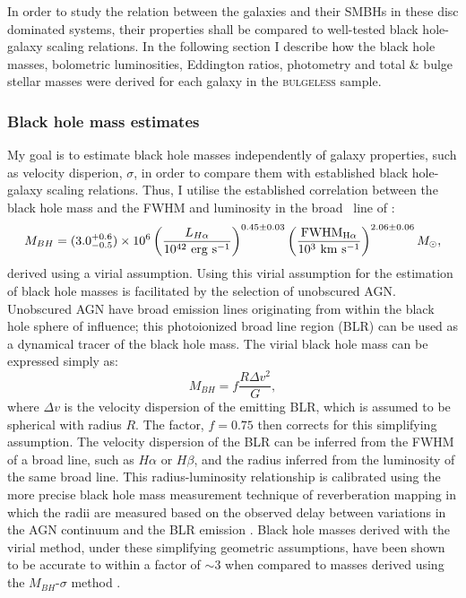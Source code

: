 In order to study the relation between the galaxies and their SMBHs in these disc dominated systems, their properties shall be compared to well-tested black hole-galaxy scaling relations. In the following section I describe how the black hole masses, bolometric luminosities, Eddington ratios, photometry and total \& bulge stellar masses were derived for each galaxy in the \textsc{bulgeless} sample. 

\subsubsection{Black hole mass estimates}\label{sec:bhmass}

My goal is to estimate black hole masses independently of galaxy properties, such as velocity disperion, $\sigma$, in order to compare them with established black hole-galaxy scaling relations. Thus, I utilise the established correlation between the black hole mass and the FWHM and luminosity in the broad \ha\ line of \citet{gh07a}: 
\begin{equation}\label{greeneho}
M_{BH} = (3.0^{+0.6}_{-0.5}) \times 10^6 \left ( \frac{L_{H\alpha}}{10^{42} ~\rm{erg}~\rm{s}^{-1}} \right )^{0.45\pm0.03} \left ( \frac{\rm{FWHM}_{H\alpha}}{10^{3}~\rm{km}~\rm{s}^{-1}} \right )^{2.06\pm0.06} M_{\odot},
\end{equation}
derived using a virial assumption. Using this virial assumption for the estimation of black hole masses is facilitated by the selection of unobscured AGN. Unobscured AGN have broad emission lines originating from within the black hole sphere of influence; this photoionized broad line region (BLR) can be used as a dynamical tracer of the black hole mass. The virial black hole mass \citep{peterson14} can be expressed simply as:
\begin{equation}\label{eq:virial}
M_{BH} = f \frac{R\Delta v^2}{G},
\end{equation}
where $\Delta v$ is the velocity dispersion of the emitting BLR, which is assumed to be spherical with radius $R$. The factor, $f = 0.75$ \citep{netzer90} then corrects for this simplifying assumption. The velocity dispersion of the BLR can be inferred from the FWHM of a broad line, such as $H\alpha$ or $H\beta$, and the radius inferred from the luminosity of the same broad line. This radius-luminosity relationship is calibrated using the more precise black hole mass measurement technique of reverberation mapping \citep{blandford82, peterson01, barth15} in which the radii are measured based on the observed delay between variations in the AGN continuum and the BLR emission \citep{kaspi05, bentz06}. Black hole masses derived with the virial method, under these simplifying geometric assumptions, have been shown to be accurate to within a factor of $\sim 3$ when compared to masses derived using the $M_{BH}$-$\sigma$ method \citep[][and see Section~\ref{agnsample}]{ferrarese01, nelson04, onken04}.

